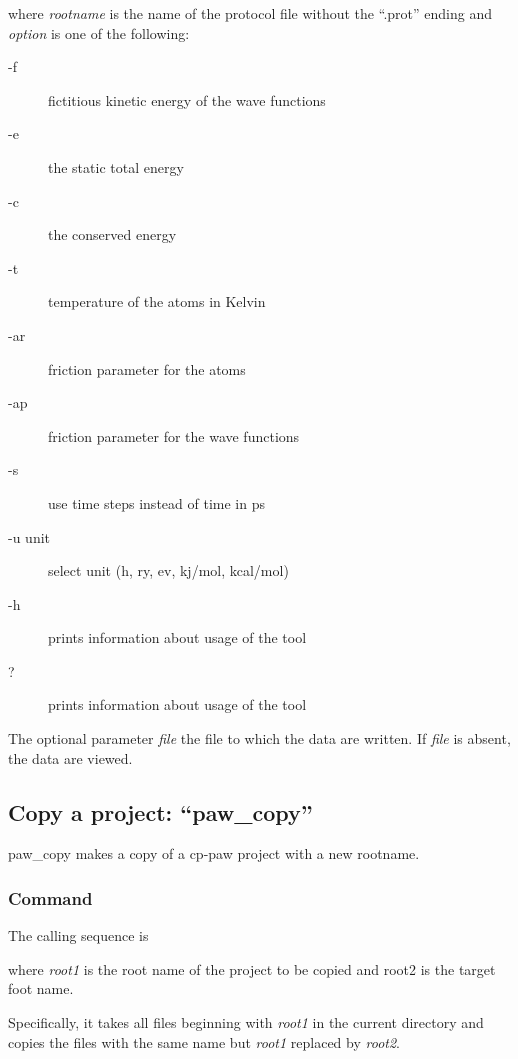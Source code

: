 \documentclass[final,12pt,makeidx,DIV=calc]{article}
\begin{document}
{{{{{{\bigskip{}\bigskip

\noindent where {\it rootname} is the name of the protocol file 
without the ``.prot'' ending and {\it option} is one of the following:
\begin{description}
\item[-f] fictitious kinetic energy of the wave functions
\item[-e] the static total energy
\item[-c] the conserved energy
\item[-t] temperature of the atoms in Kelvin
\item[-ar] friction parameter for the atoms
\item[-ap] friction parameter for the wave functions
\item[-s] use time steps instead of time in ps
\item[-u unit] select unit (h, ry, ev, kj/mol, kcal/mol)     
\item[-h] prints information about usage of the tool 
\item[?] prints information about usage of the tool 
\end{description}
The optional parameter {\it file} the file to which the data are
written. If {\it file} is absent, the data are viewed.


\subsection{Copy a project: ``paw\_copy''}
paw\_copy makes a copy of a cp-paw project with a new rootname.


\subsubsection{Command}
The calling sequence is

\bigskip{}\bigskip

\noindent where {\it root1} is the root name of the project to be
copied and root2 is the target foot name.

Specifically, it takes all files beginning with {\it root1} in the
current directory and copies the files with the same name but {\it
root1} replaced by {\it root2}.

}}}}}}
\end{document}
